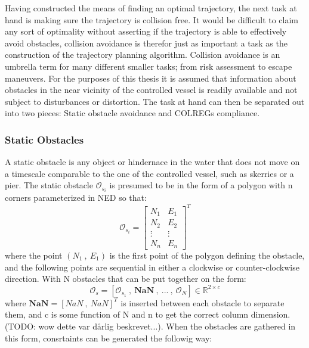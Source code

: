 Having constructed the means of finding an optimal trajectory, the next task at hand is making sure the trajectory is collision free.
It would be difficult to claim any sort of optimality without asserting if the trajectory is able to effectively avoid obstacles, collision avoidance is
therefor just as important a task as the construction of the trajectory planning algorithm. Collision avoidance is an umbrella term for many
different smaller tasks; from risk assessment to escape maneuvers. For the purposes of this thesis it is assumed that information 
about obstacles in the near vicinity of the controlled vessel is readily available and not subject to disturbances or distortion.
The task at hand can then be separated out into two pieces: Static obstacle avoidance and \gls{COLREGs} compliance. 

\subsubsection*{Static Obstacles}
A static obstacle is any object or hindernace in the water that does not move on a timescale comparable to the one of the controlled
vessel, such as skerries or a pier. The static obstacle $\mathcal{O}_{s_{i}}$ is presumed to be in the form of a polygon with n corners parameterized
in NED so that:
\begin{equation}
    \mathcal{O}_{s_{i}} = \begin{bmatrix}
                              N_1 & E_1 \\
                              N_2 & E_2 \\
                            \vdots & \vdots\\
                              N_n & E_n
                            \end{bmatrix}^T
\end{equation}
where the point $(N_1 \ , \ E_1)$ is the first point of the polygon defining the obstacle, and the following points are sequential in either a clockwise
or counter-clockwise direction. With N obstacles that can be put together on the form:
\begin{equation}
    \mathcal{O}_s = [\mathcal{O}_{s_{1}} \ , \ \textbf{NaN} \ , \ ... \ , \ \mathcal{O}_N] \in \mathbb{R}^{2 \times c}
\end{equation}
where $\textbf{NaN} = [NaN \ , \ NaN]^T$ is inserted between each obstacle to separate them, and c is some function of N and n to get the correct column dimension.
(TODO: wow dette var dårlig beskrevet...). When the obstacles are gathered in this form, consrtaints can be generated the followig way:\newline
